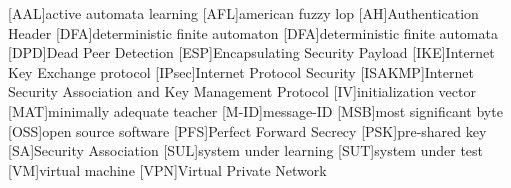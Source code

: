 \begin{acronym}
	[AAL]{active automata learning}
	[AFL]{american fuzzy lop}
	[AH]{Authentication Header}
	[DFA]{deterministic finite automaton}
	[DFA]{deterministic finite automata}
	[DPD]{Dead Peer Detection}
	[ESP]{Encapsulating Security Payload}
	[IKE]{Internet Key Exchange protocol}
	[IPsec]{Internet Protocol Security}
	[ISAKMP]{Internet Security Association and Key Management Protocol}
	[IV]{initialization vector}
	[MAT]{minimally adequate teacher}
	[M-ID]{message-ID}
	[MSB]{most significant byte}
	[OSS]{open source software}
	[PFS]{Perfect Forward Secrecy}
	[PSK]{pre-shared key}
	[SA]{Security Association}
	[SUL]{system under learning}
	[SUT]{system under test}
	[VM]{virtual machine}
	[VPN]{Virtual Private Network}
\end{acronym}
